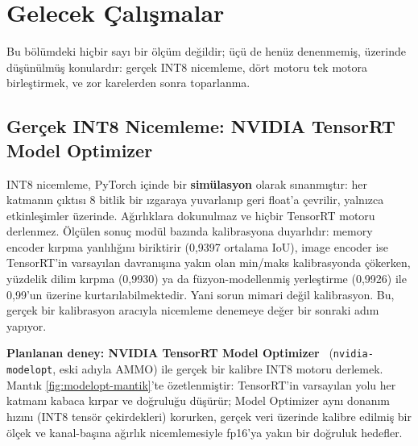 \chapter{Gelecek Çalışmalar}
\label{ch:gelecek-calismalar}

Bu bölümdeki hiçbir sayı bir ölçüm değildir; üçü de henüz denenmemiş,
üzerinde düşünülmüş konulardır: gerçek INT8 nicemleme, dört motoru tek
motora birleştirmek, ve zor karelerden sonra toparlanma.

\section{Gerçek INT8 Nicemleme: NVIDIA TensorRT Model Optimizer}
\label{sec:int8-gelecek}

INT8 nicemleme, PyTorch içinde bir \textbf{simülasyon} olarak
sınanmıştır: her katmanın çıktısı 8 bitlik bir ızgaraya yuvarlanıp geri
float'a çevrilir, yalnızca etkinleşimler üzerinde. Ağırlıklara
dokunulmaz ve hiçbir TensorRT motoru derlenmez. Ölçülen sonuç modül
bazında kalibrasyona duyarlıdır: memory encoder kırpma yanlılığını
biriktirir (0,9397 ortalama IoU), image encoder ise TensorRT'in
varsayılan davranışına yakın olan min/maks kalibrasyonda çökerken,
yüzdelik dilim kırpma (0,9930) ya da füzyon-modellenmiş yerleştirme
(0,9926) ile 0,99'un üzerine kurtarılabilmektedir. Yani sorun mimari
değil kalibrasyon. Bu, gerçek bir kalibrasyon aracıyla nicemleme
denemeye değer bir sonraki adım yapıyor.

\textbf{Planlanan deney: NVIDIA TensorRT Model
Optimizer}~\cite{nvidia2024modelopt} (\texttt{nvidia-modelopt}, eski adıyla
AMMO) ile gerçek bir kalibre INT8 motoru derlemek. Mantık
\cref{fig:modelopt-mantik}'te özetlenmiştir: TensorRT'in varsayılan yolu
her katmanı kabaca kırpar ve doğruluğu düşürür; Model Optimizer aynı
donanım hızını (INT8 tensör çekirdekleri) korurken, gerçek veri üzerinde
kalibre edilmiş bir ölçek ve kanal-başına ağırlık nicemlemesiyle
fp16'ya yakın bir doğruluk hedefler.

